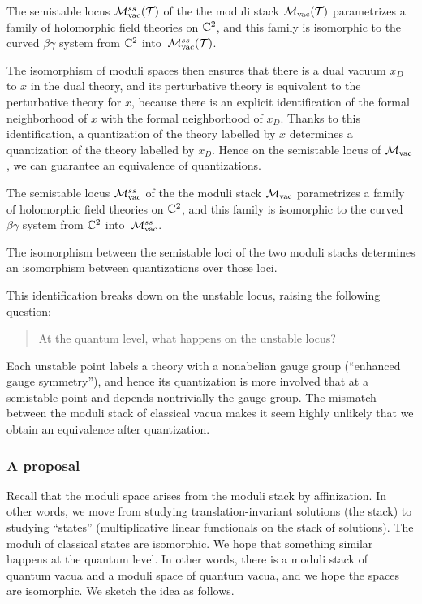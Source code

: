 \documentclass[11pt]{amsart}
\begin{document}
\begin{prop}
The semistable locus $\mathcal M_{\rm vac}^{ss}(\mathcal T)$ of the the moduli stack $\mathcal M_{\rm vac}(\mathcal T)$ parametrizes a family of holomorphic field theories on $\mathbb C^2$, 
and this family is isomorphic to the curved $\beta\gamma$ system from $\mathbb C^2$ into~$\mathcal M_{\rm vac}^{ss}(\mathcal T)$.
\end{prop}

The isomorphism of moduli spaces then ensures that there is a dual vacuum $x_D$ to $x$ in the dual theory, and its perturbative theory is equivalent to the perturbative theory for $x$,
because there is an explicit identification of the formal neighborhood of $x$ with the formal neighborhood of $x_D$. 
Thanks to this identification, a quantization of the theory labelled by $x$ determines a quantization of the theory labelled by $x_D$.
Hence on the semistable locus of $\mathcal M_{\rm vac}$, we can guarantee an equivalence of quantizations.

\begin{prop}
The semistable locus $\mathcal M_{\rm vac}^{ss}$ of the the moduli stack $\mathcal M_{\rm vac}$ parametrizes a family of holomorphic field theories on $\mathbb C^2$, 
and this family is isomorphic to the curved $\beta\gamma$ system from $\mathbb C^2$ into~$\mathcal M_{\rm vac}^{ss}$.

The isomorphism between the semistable loci of the two moduli stacks determines an isomorphism between quantizations over those loci.
\end{prop}

This identification breaks down on the unstable locus, raising the following question:
\begin{quote}
At the quantum level, what happens on the unstable locus? 
\end{quote}
Each unstable point labels a theory with a nonabelian gauge group (``enhanced gauge symmetry''),
and hence its quantization is more involved that at a semistable point and depends nontrivially the gauge group.
The mismatch between the moduli stack of classical vacua makes it seem highly unlikely that we obtain an equivalence after quantization.

\subsubsection{A proposal}

Recall that the moduli space arises from the moduli stack by affinization.
In other words, we move from studying translation-invariant solutions (the stack) to studying ``states'' (multiplicative linear functionals on the stack of solutions).
The moduli of classical states are isomorphic.
We hope that something similar happens at the quantum level.
In other words, there is a moduli stack of quantum vacua and a moduli space of quantum vacua,
and we hope the spaces are isomorphic.
We sketch the idea as follows.
\end{document}
